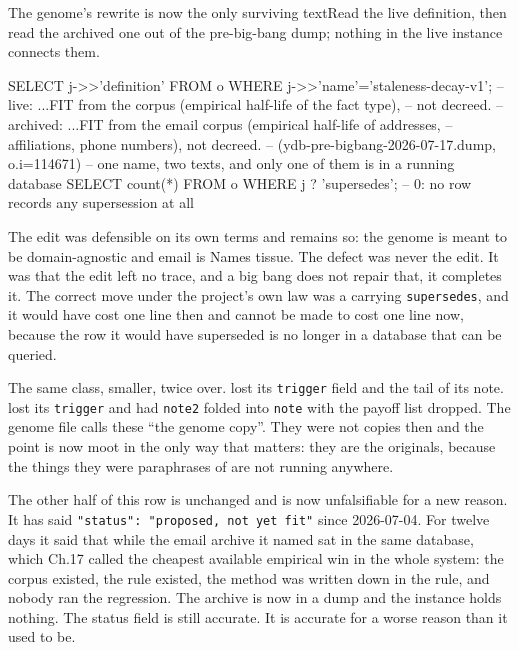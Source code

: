 \begin{Correspondence}{The genome's rewrite is now the only surviving text}{Read the live definition, then read the archived one out of the pre-big-bang dump; nothing in the live instance connects them.}
\begin{Check}
SELECT j->>'definition' FROM o WHERE j->>'name'='staleness-decay-v1';
-- live:     ...FIT from the corpus (empirical half-life of the fact type),
--              not decreed.
-- archived: ...FIT from the email corpus (empirical half-life of addresses,
--              affiliations, phone numbers), not decreed.
--              (ydb-pre-bigbang-2026-07-17.dump, o.i=114671)
-- one name, two texts, and only one of them is in a running database
SELECT count(*) FROM o WHERE j ? 'supersedes';   -- 0: no row records any supersession at all
\end{Check}
The edit was defensible on its own terms and remains so: the genome is meant to be domain-agnostic and email is Names tissue. The defect was never the edit. It was that the edit left no trace, and a big bang does not repair that, it completes it. The correct move under the project's own law was a  carrying \texttt{supersedes}, and it would have cost one line then and cannot be made to cost one line now, because the row it would have superseded is no longer in a database that can be queried.
\end{Correspondence}

The same class, smaller, twice over.  lost its \texttt{trigger} field and the tail of its note.  lost its \texttt{trigger} and had \texttt{note2} folded into \texttt{note} with the payoff list dropped. The genome file calls these ``the genome copy''. They were not copies then and the point is now moot in the only way that matters: they are the originals, because the things they were paraphrases of are not running anywhere.

The other half of this row is unchanged and is now unfalsifiable for a new reason. It has said \texttt{"status": "proposed, not yet fit"} since 2026-07-04. For twelve days it said that while the email archive it named sat in the same database, which Ch.17 called the cheapest available empirical win in the whole system: the corpus existed, the rule existed, the method was written down in the rule, and nobody ran the regression. The archive is now in a dump and the instance holds nothing. The status field is still accurate. It is accurate for a worse reason than it used to be.

